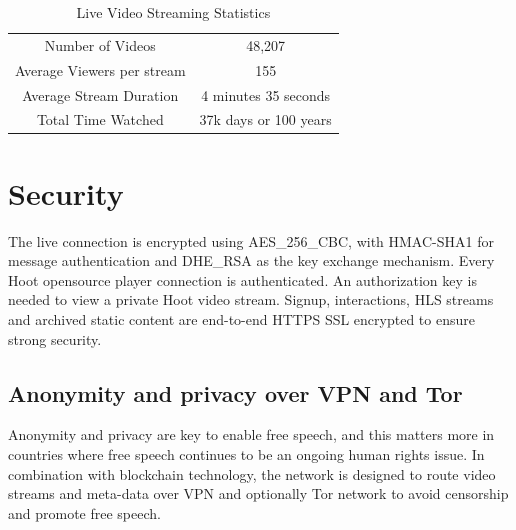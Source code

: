 \documentclass{article}
\begin{document}
\begin{table}[!htb]
\centering
\begin{tabular}{ |c|c| }
\hline
\rowcolor{lightgray} \multicolumn{2}{|c|}{Live Video Streaming Statistics} \\
\hline
Number of Videos & 48,207 \\
Average Viewers per stream & 155 \\
Average Stream Duration & 4 minutes 35 seconds \\
Total Time Watched & 37k days or 100 years \\
\hline
\end{tabular}
\caption{Live Video Streaming Statistics}
\label{table:2}
\end{table}

\section{Security}
The live connection is encrypted using AES\_256\_CBC, with HMAC-SHA1 for message authentication and DHE\_RSA as the key exchange mechanism. Every Hoot opensource player connection is authenticated.
An authorization key is needed to view a private Hoot video stream. Signup, interactions, HLS streams and archived static content are end-to-end HTTPS SSL encrypted to ensure strong security. 

\subsection{Anonymity and privacy over VPN and Tor}
Anonymity and privacy are key to enable free speech, and this matters more in countries where free speech continues to be an ongoing human rights issue. In combination with blockchain technology, the network is designed to route video streams and meta-data over VPN and optionally Tor network to avoid censorship and promote free speech.
\end{document}
